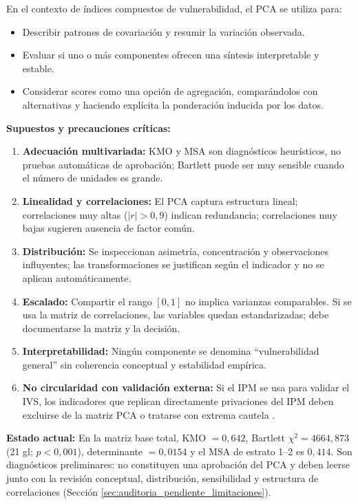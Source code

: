 En el contexto de índices compuestos de vulnerabilidad, el PCA se utiliza para:

\begin{itemize}
    \item Describir patrones de covariación y resumir la variación observada.
    \item Evaluar si uno o más componentes ofrecen una síntesis interpretable y estable.
    \item Considerar scores como una opción de agregación, comparándolos con alternativas y haciendo explícita la ponderación inducida por los datos.
\end{itemize}

\textbf{Supuestos y precauciones críticas:}

\begin{enumerate}
    \item \textbf{Adecuación multivariada:} KMO y MSA son diagnósticos heurísticos, no pruebas automáticas de aprobación; Bartlett puede ser muy sensible cuando el número de unidades es grande.
    \item \textbf{Linealidad y correlaciones:} El PCA captura estructura lineal; correlaciones muy altas ($|r|>0,9$) indican redundancia; correlaciones muy bajas sugieren ausencia de factor común.
    \item \textbf{Distribución:} Se inspeccionan asimetría, concentración y observaciones influyentes; las transformaciones se justifican según el indicador y no se aplican automáticamente.
    \item \textbf{Escalado:} Compartir el rango $[0,1]$ no implica varianzas comparables. Si se usa la matriz de correlaciones, las variables quedan estandarizadas; debe documentarse la matriz y la decisión.
    \item \textbf{Interpretabilidad:} Ningún componente se denomina ``vulnerabilidad general'' sin coherencia conceptual y estabilidad empírica.
    \item \textbf{No circularidad con validación externa:} Si el IPM se usa para validar el IVS, los indicadores que replican directamente privaciones del IPM deben excluirse de la matriz PCA o tratarse con extrema cautela \citep{booysen2002overview}.
\end{enumerate}

\textbf{Estado actual:} En la matriz base total, KMO $=0,642$, Bartlett $\chi^2=4664,873$ (21 gl; $p<0,001$), determinante $=0,0154$ y el MSA de estrato 1--2 es $0,414$. Son diagnósticos preliminares: no constituyen una aprobación del PCA y deben leerse junto con la revisión conceptual, distribución, sensibilidad y estructura de correlaciones (Sección \ref{sec:auditoria_pendiente_limitaciones}).

